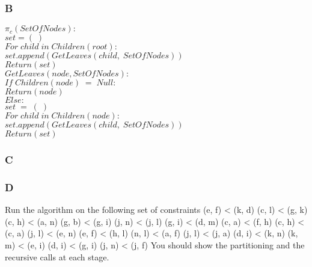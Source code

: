 \documentclass[paper=a4, fontsize=11pt]{scrartcl}
\newcommand\tab[1][1cm]{\hspace*{#1}}
\newcommand\dent[1][0.5cm]{\hspace*{#1}}
\numberwithin{equation}{section}		%
\numberwithin{figure}{section}			%
\numberwithin{table}{section}				%
\begin{document}
\subsubsection*{B}

\iffalse
Expand the partition step (given below) in pseudocode
compute πC = S1, S2, . . . Sr;
\fi


\dent$\pi_c(SetOfNodes):$\\
\tab$set = (\;)$\\
\tab$For\;child\;in\;Children(root):$\\
\tab\tab$set.append(GetLeaves(child,\;SetOfNodes))$\\
\tab$Return(set)$ \\

$GetLeaves(node,SetOfNodes):$\\
\tab$If\;Children(node)\;=\;Null:$\\
\tab\tab$Return(node)$\\
\tab$Else:$\\
\tab\tab$set\;=\;(\;)$\\
\tab\tab$For\;child\;in\;Children(node):$\\
\tab\tab\tab$set.append(GetLeaves(child,\;SetOfNodes))$\\
\tab\tab$Return(set)$

\subsubsection*{C}

\iffalse
Write a recurrence that expresses the running time of Build depending on the
number of different leaf-labels n and the number of constraints m. Use it to
estimate the running time of the algorithm assuming that the partitioning step
runs in time f (n, m) for some function monotonically nondecreasing function f.
\fi



\subsubsection*{D}

\iffalse
Run the algorithm on the following set of constraints
(e, f) < (k, d) (c, l) < (g, k) (c, h) < (a, n) (g, b) < (g, i) (j, n) < (j, l) (g, i) < (d, m) (c, a) < (f, h) (c, h) < (c, a) (j, l) < (e, n) (e, f) < (h, l) (n, l) < (a, f) (j, l) < (j, a) (d, i) < (k, n) (k, m) < (e, i) (d, i) < (g, i) (j, n) < (j, f)
You should show the partitioning and the recursive calls at each stage.
\end{document}

